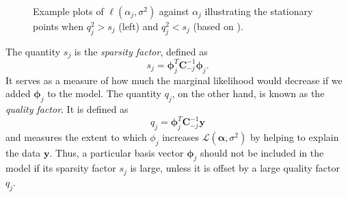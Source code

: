 \begin{figure}
  \centering
  \caption[Plots of the Marginal Likelihood Function]{Example plots of $\ell(\alpha_j,\sigma^2)$ against $\alpha_j$ illustrating the stationary points when $q_j^2>s_j$ (left) and $q_j^2<s_j$ (based on \cite{tipping2002}).}
  \label{fig:ml_plot}
\end{figure}

The quantity $s_j$ is the \emph{sparsity factor}, defined as
\begin{equation*}
  s_j = \bm\phi_j^T\bm C_{-j}^{-1}\bm\phi_j.
\end{equation*}
It serves as a measure of how much the marginal likelihood would decrease if we added $\bm\phi_j$ to the model.
The quantity $q_j$, on the other hand, is known as the \emph{quality factor}.
It is defined as
\begin{equation*}
  q_j = \bm\phi_j^T\bm C_{-j}^{-1} \bm y
\end{equation*}
and measures the extent to which $\phi_j$ increases $\mathcal{L}(\bm\alpha,\sigma^2)$ by helping to explain the data $\bm y$.
Thus, a particular basis vector $\bm\phi_j$ should not be included in the model if its sparsity factor $s_j$ is large, unless it is offset by a large quality factor $q_j$.


